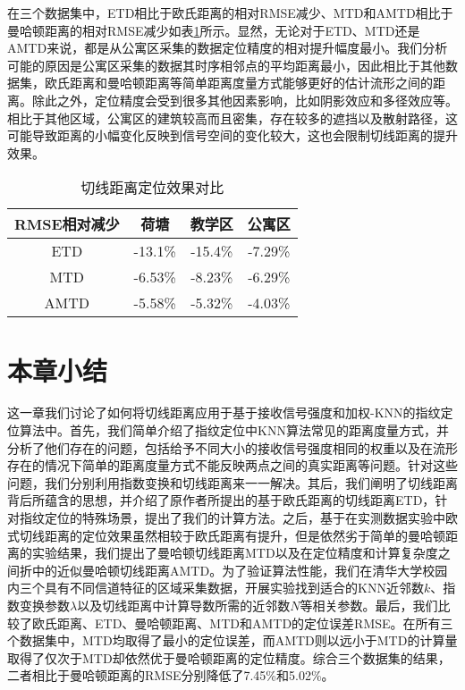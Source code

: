 在三个数据集中，ETD相比于欧氏距离的相对RMSE减少、MTD和AMTD相比于曼哈顿距离的相对RMSE减少如表\ref{tab:td_relative}所示。显然，无论对于ETD、MTD还是AMTD来说，都是从公寓区采集的数据定位精度的相对提升幅度最小。我们分析可能的原因是公寓区采集的数据其时序相邻点的平均距离最小，因此相比于其他数据集，欧氏距离和曼哈顿距离等简单距离度量方式能够更好的估计流形之间的距离。除此之外，定位精度会受到很多其他因素影响，比如阴影效应和多径效应等。相比于其他区域，公寓区的建筑较高而且密集，存在较多的遮挡以及散射路径，这可能导致距离的小幅变化反映到信号空间的变化较大，这也会限制切线距离的提升效果。

\begin{table}[htb]
	\caption{切线距离定位效果对比}
	\begin{center}
		\begin{tabular}{cccc}
			\toprule
			RMSE相对减少 &  荷塘 & 教学区 & 公寓区 \\
			\midrule
			ETD & -13.1\% & -15.4\% & -7.29\% \\
			\midrule
			MTD & -6.53\% & -8.23\% & -6.29\% \\
			\midrule
			AMTD & -5.58\% & -5.32\% & -4.03\% \\
			\bottomrule
		\end{tabular}
		\label{tab:td_relative}
	\end{center}
\end{table}

\section{本章小结}

这一章我们讨论了如何将切线距离应用于基于接收信号强度和加权-KNN的指纹定位算法中。首先，我们简单介绍了指纹定位中KNN算法常见的距离度量方式，并分析了他们存在的问题，包括给予不同大小的接收信号强度相同的权重以及在流形存在的情况下简单的距离度量方式不能反映两点之间的真实距离等问题。针对这些问题，我们分别利用指数变换和切线距离来一一解决。其后，我们阐明了切线距离背后所蕴含的思想，并介绍了原作者所提出的基于欧氏距离的切线距离ETD，针对指纹定位的特殊场景，提出了我们的计算方法。之后，基于在实测数据实验中欧式切线距离的定位效果虽然相较于欧氏距离有提升，但是依然劣于简单的曼哈顿距离的实验结果，我们提出了曼哈顿切线距离MTD以及在定位精度和计算复杂度之间折中的近似曼哈顿切线距离AMTD。为了验证算法性能，我们在清华大学校园内三个具有不同信道特征的区域采集数据，开展实验找到适合的KNN近邻数$k$、指数变换参数$\lambda$以及切线距离中计算导数所需的近邻数$N$等相关参数。最后，我们比较了欧氏距离、ETD、曼哈顿距离、MTD和AMTD的定位误差RMSE。在所有三个数据集中，MTD均取得了最小的定位误差，而AMTD则以远小于MTD的计算量取得了仅次于MTD却依然优于曼哈顿距离的定位精度。综合三个数据集的结果，二者相比于曼哈顿距离的RMSE分别降低了7.45\%和5.02\%。






